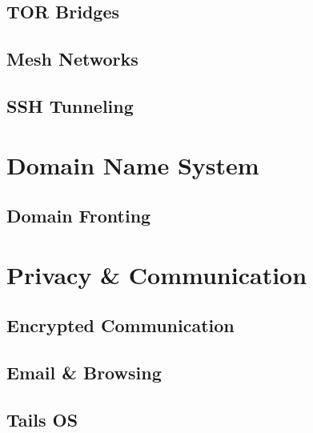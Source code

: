 \subsection{TOR Bridges}
\subsection{Mesh Networks}
\subsection{SSH Tunneling}



\section{Domain Name System}

\subsection{Domain Fronting}
\subsection{}
\subsection{}


\section{Privacy \& Communication}

\subsection{Encrypted Communication}
\subsection{Email \& Browsing}
\subsection{Tails OS}




\section{}

\subsection{}
\subsection{}
\subsection{}
